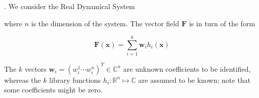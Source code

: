\documentclass{article}
\begin{document}
    \cite{Goncalves}. We consider the Real Dynamical System

    where $n$ is the dimension of the system. The vector field $\mathbf{F}$ is in turn of the form

    \begin{equation}
        \mathbf{F}(\mathbf{x}) = \sum_{i = 1}^{k} \mathbf{w}_i h_i \left( \mathbf{x} \right)
    \end{equation}

    The $k$ vectors $\mathbf{w}_i = \left( w_i^1 \cdots w_i^n \right)^T \in \mathbb{C}^n$ are unknown coefficients to be identified, whereas the $k$ library functions $h_i : \mathbb{R}^n \mapsto \mathbb{C}$ are assumed to be known; note that some coefficients might be zero.



    
\end{document}
